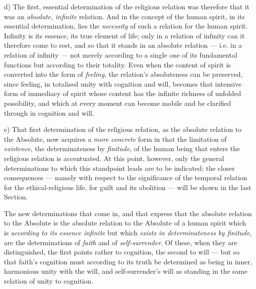 \documentclass[12pt,a4paper]{book}
\begin{document}
d) The first, essential determination of the religious relation was therefore
that it was an \emph{absolute, infinite} relation. And in the concept of the
human spirit, in its essential determination, lies the \emph{necessity} of
such a relation for the human spirit. Infinity is its essence, its true
element of life; only in a relation of infinity can it therefore come to rest,
and so that it stands in an absolute relation --- i.e. in a relation of
infinity --- not merely according to a single one of its fundamental functions
but according to their totality. Even when the content of spirit is converted
into the form of \emph{feeling}, the relation's absoluteness can be preserved,
since feeling, in totalised unity with cognition and will, becomes that
intensive form of immediacy of spirit whose content has the infinite richness
of unfolded possibility, and which at every
moment can become mobile and be clarified through in cognition and will.

e) That first determination of the religious relation, as the absolute
relation to the Absolute, now acquires a \emph{more concrete} form in that the
limitation of \emph{existence}, the determinateness by \emph{finitude}, of the
human being that enters the religious relation is accentuated. At this point,
however, only the general determinations to which this standpoint leads are to
be indicated; the closer consequences --- namely with respect to the
significance of the temporal relation for the ethical-religious life, for
guilt and its abolition --- will be shown in the last Section.

The new determinations that come in, and that express that the absolute
relation to the Absolute is the absolute relation to the Absolute of a human
spirit which is \emph{according to its essence infinite} but which
\emph{exists in determinateness by finitude}, are the determinations of
\emph{faith} and of \emph{self-surrender}. Of these, when they are
distinguished, the first points rather to cognition, the second to will --- but
so that faith's cognition must according to its truth be determined as being
in inner, harmonious unity with the will, and self-surrender's will as
standing in the same relation of unity to cognition.
\end{document}

